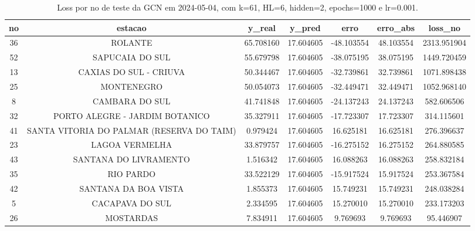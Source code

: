 \begin{table}[h]
\centering
\caption{Loss por no de teste da GCN em 2024-05-04, com k=61, HL=6, hidden=2, epochs=1000 e lr=0.001.}
\label{tab:gcn_loss_k61_hl6_h2_e1000_d20240504}
\begin{tabular}{ccccccc}
\toprule
no & estacao & y\_real & y\_pred & erro & erro\_abs & loss\_no \\
\midrule
36 & ROLANTE & 65.708160 & 17.604605 & -48.103554 & 48.103554 & 2313.951904 \\
52 & SAPUCAIA DO SUL & 55.679798 & 17.604605 & -38.075195 & 38.075195 & 1449.720459 \\
13 & CAXIAS DO SUL - CRIUVA & 50.344467 & 17.604605 & -32.739861 & 32.739861 & 1071.898438 \\
25 & MONTENEGRO & 50.054073 & 17.604605 & -32.449471 & 32.449471 & 1052.968140 \\
8 & CAMBARA DO SUL & 41.741848 & 17.604605 & -24.137243 & 24.137243 & 582.606506 \\
32 & PORTO ALEGRE - JARDIM BOTANICO & 35.327911 & 17.604605 & -17.723307 & 17.723307 & 314.115601 \\
41 & SANTA VITORIA DO PALMAR (RESERVA DO TAIM) & 0.979424 & 17.604605 & 16.625181 & 16.625181 & 276.396637 \\
23 & LAGOA VERMELHA & 33.879757 & 17.604605 & -16.275152 & 16.275152 & 264.880585 \\
43 & SANTANA DO LIVRAMENTO & 1.516342 & 17.604605 & 16.088263 & 16.088263 & 258.832184 \\
35 & RIO PARDO & 33.522129 & 17.604605 & -15.917524 & 15.917524 & 253.367584 \\
42 & SANTANA DA BOA VISTA & 1.855373 & 17.604605 & 15.749231 & 15.749231 & 248.038284 \\
5 & CACAPAVA DO SUL & 2.334595 & 17.604605 & 15.270010 & 15.270010 & 233.173203 \\
26 & MOSTARDAS & 7.834911 & 17.604605 & 9.769693 & 9.769693 & 95.446907 \\
\bottomrule
\end{tabular}
\end{table}
